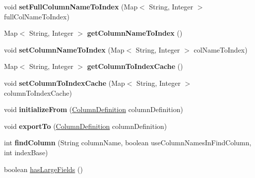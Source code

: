 \begin{DoxyCompactItemize}
\item 
\mbox{\label{interfacecom_1_1mysql_1_1cj_1_1protocol_1_1_column_definition_a75168874688cd04aa48f269036d2227d}} 
void {\bfseries set\+Full\+Column\+Name\+To\+Index} (Map$<$ String, Integer $>$ full\+Col\+Name\+To\+Index)
\item 
\mbox{\label{interfacecom_1_1mysql_1_1cj_1_1protocol_1_1_column_definition_ad5ae6c46f96994220e21085f7aa00baa}} 
Map$<$ String, Integer $>$ {\bfseries get\+Column\+Name\+To\+Index} ()
\item 
\mbox{\label{interfacecom_1_1mysql_1_1cj_1_1protocol_1_1_column_definition_a9294ea39f51afb604fa3579338bfa671}} 
void {\bfseries set\+Column\+Name\+To\+Index} (Map$<$ String, Integer $>$ col\+Name\+To\+Index)
\item 
\mbox{\label{interfacecom_1_1mysql_1_1cj_1_1protocol_1_1_column_definition_a1317a18af8dde169cb972926f8e3521b}} 
Map$<$ String, Integer $>$ {\bfseries get\+Column\+To\+Index\+Cache} ()
\item 
\mbox{\label{interfacecom_1_1mysql_1_1cj_1_1protocol_1_1_column_definition_a1972ecc1b6610bbb394af09827c4643f}} 
void {\bfseries set\+Column\+To\+Index\+Cache} (Map$<$ String, Integer $>$ column\+To\+Index\+Cache)
\item 
\mbox{\label{interfacecom_1_1mysql_1_1cj_1_1protocol_1_1_column_definition_a3acff373088009fd3c2653b01cf0f7fe}} 
void {\bfseries initialize\+From} (\mbox{\hyperlink{interfacecom_1_1mysql_1_1cj_1_1protocol_1_1_column_definition}{Column\+Definition}} column\+Definition)
\item 
\mbox{\label{interfacecom_1_1mysql_1_1cj_1_1protocol_1_1_column_definition_ae382d41d473df7f74ce51d22c18b1aa6}} 
void {\bfseries export\+To} (\mbox{\hyperlink{interfacecom_1_1mysql_1_1cj_1_1protocol_1_1_column_definition}{Column\+Definition}} column\+Definition)
\item 
\mbox{\label{interfacecom_1_1mysql_1_1cj_1_1protocol_1_1_column_definition_a9082cb797c01aec299496d0d2fe41528}} 
int {\bfseries find\+Column} (String column\+Name, boolean use\+Column\+Names\+In\+Find\+Column, int index\+Base)
\item 
boolean \mbox{\hyperlink{interfacecom_1_1mysql_1_1cj_1_1protocol_1_1_column_definition_adc02edd67e54d79c7f91d41d027e44ae}{has\+Large\+Fields}} ()
\end{DoxyCompactItemize}


